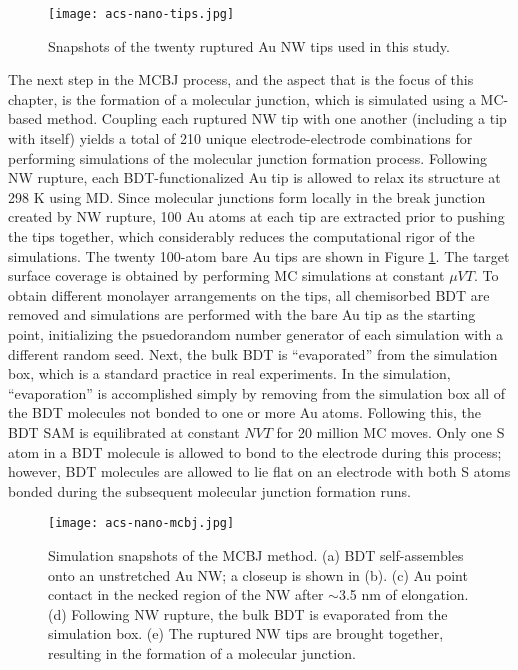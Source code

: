 \documentclass[10pt]{report}  %
\begin{document}
\begin{figure}[h!]
	\centering
	\texttt{[image: acs-nano-tips.jpg]}
	\caption{Snapshots of the twenty ruptured Au NW tips used in this study.}
	\label{fig:acs-nano-tips}
\end{figure}

The next step in the MCBJ process, and the aspect that is the focus of this chapter, is the formation of a molecular junction, which is simulated using a MC-based method. Coupling each ruptured NW tip with one another (including a tip with itself) yields a total of 210 unique electrode-electrode combinations for performing simulations of the molecular junction formation process. Following NW rupture, each BDT-functionalized Au tip is allowed to relax its structure at 298 K using MD.  Since molecular junctions form locally in the break junction created by NW rupture, 100 Au atoms at each tip are extracted prior to pushing the tips together, which considerably reduces the computational rigor of the simulations. The twenty 100-atom bare Au tips are shown in Figure \ref{fig:acs-nano-tips}. The target surface coverage is obtained by performing MC simulations at constant $\mu$$VT$.  To obtain different monolayer arrangements on the tips, all chemisorbed BDT are removed and simulations are performed with the bare Au tip as the starting point, initializing the psuedorandom number generator of each simulation with a different random seed. Next, the bulk BDT is ``evaporated'' from the simulation box, which is a standard practice \cite{Reed:1997} in real experiments.  In the simulation, ``evaporation'' is accomplished simply by removing from the simulation box all of the BDT molecules not bonded to one or more Au atoms.  Following this, the BDT SAM is equilibrated at constant $NVT$ for 20 million MC moves.  Only one S atom in a BDT molecule is allowed to bond to the electrode during this process; however, BDT molecules are allowed to lie flat on an electrode with both S atoms bonded during the subsequent molecular junction formation runs. 

\begin{figure}[]
	\centering
	\texttt{[image: acs-nano-mcbj.jpg]}
	\caption{Simulation snapshots of the MCBJ method. (a) BDT self-assembles onto an unstretched Au NW; a closeup is shown in (b). (c) Au point contact in the necked region of the NW after $\sim$3.5 nm of elongation. (d) Following NW rupture, the bulk BDT is evaporated from the simulation box. (e) The ruptured NW tips are brought together, resulting in the formation of a molecular junction.}
	\label{fig:acs-nano-mcbj}
\end{figure}
\end{document}
